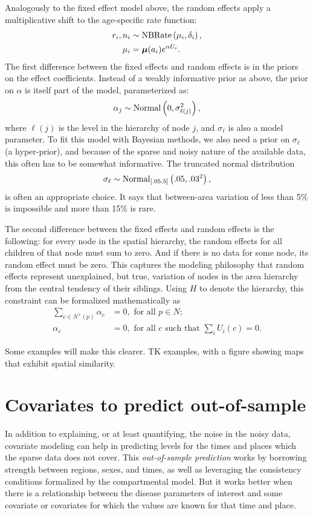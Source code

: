 Analogously to the fixed effect model above, the random effects apply
a multiplicative shift to the age-specific rate function:
\begin{align*}
r_i, n_i &\sim \operatorname{NBRate}\left(\mu_i, \delta_i\right),\\
\mu_i &= \boldsymbol{\mu}(a_i)e^{\alpha U_i}.
\end{align*}
The first difference between the fixed effects and random effects is
in the priors on the effect coefficients.  Instead of a weakly
informative prior as above, the prior on $\alpha$ is itself part of
the model, parameterized as:
\[
\alpha_j \sim \operatorname{Normal}\left(0, \sigma_{\ell(j)}^2\right),
\]
where $\ell(j)$ is the level in the hierarchy of node $j$, and
$\sigma_\ell$ is also a model parameter. To fit this model with
Bayesian methods, we also need a prior on $\sigma_\ell$ (a
hyper-prior), and because of the sparse and noisy nature of the
available data, this often has to be somewhat informative.  The
truncated normal distribution
\[
\sigma_\ell \sim \operatorname{Normal}_{[.05,5]}\left(.05, .03^2\right),
\]
is often an appropriate choice. It says that between-area variation of
less than 5\% is impossible and more than 15\% is rare.

The second difference between the fixed effects and random effects is
the following: for every node in the spatial hierarchy, the random
effects for all children of that node must sum to zero.  And if there
is no data for some node, its random effect must be zero.  This
captures the modeling philosophy that random effects represent
unexplained, but true, variation of nodes in the area hierarchy from
the central tendency of their siblings.  Using $H$ to denote the
hierarchy, this constraint can be formalized mathematically as
\begin{align*}
\sum_{c\in N^+(p)} \alpha_c &= 0, \text{ for all } p \in N;\\
\alpha_c &=0, \text{ for all $c$ such that } \sum_{i} U_i(c) = 0.
\end{align*}

Some examples will make this clearer.  TK examples, with a figure
showing maps that exhibit spatial similarity.

\section{Covariates to predict out-of-sample}

In addition to explaining, or at least quantifying, the noise in the
noisy data, covariate modeling can help in predicting levels for the
times and places which the sparse data does not cover.  This
\emph{out-of-sample prediction} works by borrowing strength between
regions, sexes, and times, as well as leveraging the consistency
conditions formalized by the compartmental model.  But it works better
when there is a relationship between the disease parameters of
interest and some covariate or covariates for which the values are
known for that time and place.

